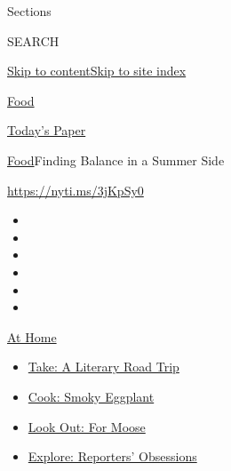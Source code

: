 Sections

SEARCH

\protect\hyperlink{site-content}{Skip to
content}\protect\hyperlink{site-index}{Skip to site index}

\href{https://www.nytimes3xbfgragh.onion/section/food}{Food}

\href{https://myaccount.nytimes3xbfgragh.onion/auth/login?response_type=cookie\&client_id=vi}{}

\href{https://www.nytimes3xbfgragh.onion/section/todayspaper}{Today's
Paper}

\href{/section/food}{Food}\textbar{}Finding Balance in a Summer Side

\url{https://nyti.ms/3jKpSy0}

\begin{itemize}
\item
\item
\item
\item
\item
\item
\end{itemize}

\href{https://www.nytimes3xbfgragh.onion/spotlight/at-home?action=click\&pgtype=Article\&state=default\&region=TOP_BANNER\&context=at_home_menu}{At
Home}

\begin{itemize}
\tightlist
\item
  \href{https://www.nytimes3xbfgragh.onion/2020/07/28/books/time-for-a-literary-road-trip.html?action=click\&pgtype=Article\&state=default\&region=TOP_BANNER\&context=at_home_menu}{Take:
  A Literary Road Trip}
\item
  \href{https://www.nytimes3xbfgragh.onion/2020/07/29/magazine/bored-with-your-home-cooking-some-smoky-eggplant-will-fix-that.html?action=click\&pgtype=Article\&state=default\&region=TOP_BANNER\&context=at_home_menu}{Cook:
  Smoky Eggplant}
\item
  \href{https://www.nytimes3xbfgragh.onion/2020/07/27/travel/moose-michigan-isle-royale.html?action=click\&pgtype=Article\&state=default\&region=TOP_BANNER\&context=at_home_menu}{Look
  Out: For Moose}
\item
  \href{https://www.nytimes3xbfgragh.onion/interactive/2020/at-home/even-more-reporters-editors-diaries-lists-recommendations.html?action=click\&pgtype=Article\&state=default\&region=TOP_BANNER\&context=at_home_menu}{Explore:
  Reporters' Obsessions}
\end{itemize}

